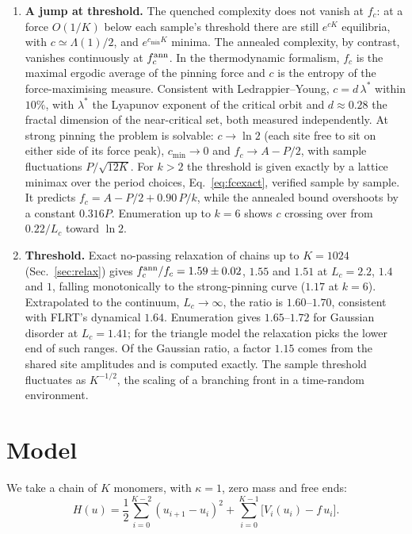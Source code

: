 \documentclass[10pt,a4paper]{article}
\begin{document}
\begin{enumerate}
\item \textbf{A jump at threshold.} The quenched complexity does not vanish at $f_c$: at a force $O(1/K)$ below each sample's threshold there are still $e^{cK}$ equilibria, with $c\simeq\Lambda(1)/2$, and $e^{c_{\min}K}$ minima. The annealed complexity, by contrast, vanishes continuously at $f_c^{\rm ann}$. In the thermodynamic formalism, $f_c$ is the maximal ergodic average of the pinning force and $c$ is the entropy of the force-maximising measure. Consistent with Ledrappier--Young, $c=d\,\lambda^*$ within $10\%$, with $\lambda^*$ the Lyapunov exponent of the critical orbit and $d\approx0.28$ the fractal dimension of the near-critical set, both measured independently. At strong pinning the problem is solvable: $c\to\ln2$ (each site free to sit on either side of its force peak), $c_{\min}\to0$ and $f_c\to A-P/2$, with sample fluctuations $P/\sqrt{12K}$. For $k>2$ the threshold is given exactly by a lattice minimax over the period choices, Eq.~\eqref{eq:fcexact}, verified sample by sample. It predicts $f_c=A-P/2+0.90\,P/k$, while the annealed bound overshoots by a constant $0.316P$. Enumeration up to $k=6$ shows $c$ crossing over from $0.22/L_c$ toward $\ln2$.
\item \textbf{Threshold.} Exact no-passing relaxation of chains up to $K=1024$ (Sec.~\ref{sec:relax}) gives $f_c^{\rm ann}/f_c=1.59\pm0.02$, $1.55$ and $1.51$ at $L_c=2.2$, $1.4$ and $1$, falling monotonically to the strong-pinning curve ($1.17$ at $k=6$). Extrapolated to the continuum, $L_c\to\infty$, the ratio is $1.60$--$1.70$, consistent with FLRT's dynamical $1.64$. Enumeration gives $1.65$--$1.72$ for Gaussian disorder at $L_c=1.41$; for the triangle model the relaxation picks the lower end of such ranges. Of the Gaussian ratio, a factor $1.15$ comes from the shared site amplitudes and is computed exactly. The sample threshold fluctuates as $K^{-1/2}$, the scaling of a branching front in a time-random environment.
\end{enumerate}

\section{Model}

We take a chain of $K$ monomers, with $\kappa=1$, zero mass and free ends:
\begin{equation}
H(u)=\frac12\sum_{i=0}^{K-2}(u_{i+1}-u_i)^2+\sum_{i=0}^{K-1}\big[V_i(u_i)-f\,u_i\big].
\end{equation}
\end{document}
